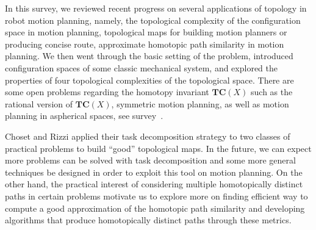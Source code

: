 In this survey, we reviewed recent progress on several applications of topology in robot motion planning, namely, the topological complexity of the configuration space in motion planning, topological maps for building motion planners or producing concise route, approximate homotopic path similarity in motion planning.
We then went through the basic setting of the problem, introduced configuration spaces of some classic mechanical system, and explored the properties of four topological complexities of the topological space.
There are some open problems regarding the homotopy invariant \(\mathbf{TC}(X)\) such as the rational version of \(\mathbf{TC}(X)\), symmetric motion planning, as well as motion planning in aspherical spaces, see survey~\cite{farber2006topology}.

Choset and Rizzi applied their task decomposition strategy to two classes of practical problems to build ``good'' topological maps. In the future, we can expect more problems can be solved with task decomposition and some more general techniques be designed in order to exploit this tool on motion planning. On the other hand, the practical interest of considering multiple homotopically distinct paths in certain problems motivate us to explore more on finding efficient way to compute a good approximation of the homotopic path similarity and developing algorithms that produce homotopically distinct paths through these metrics.
